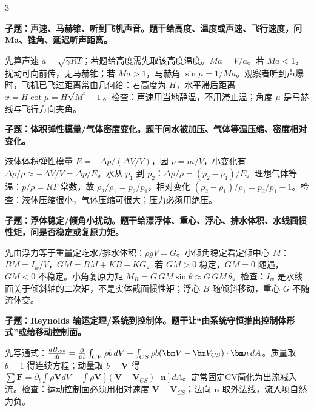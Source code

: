 \documentclass[a4paper]{article}
\newcommand{\qt}[1]{\vspace{0.04pt}\colorbox{Q}{\parbox{\dimexpr\linewidth-2\fboxsep}{\color{white}\bfseries #1}}\par}
\newcommand{\ans}[1]{\colorbox{G}{\parbox{\dimexpr\linewidth-2\fboxsep}{#1}}\par}
\begin{document}
\begin{multicols}{3}
\qt{子题：声速、马赫锥、听到飞机声音。题干给高度、温度或声速、飞行速度，问 Ma、锥角、延迟听声距离。}
\ans{先算声速 $a=\sqrt{\gamma RT}$；若题给高度需先取该高度温度。$Ma=V/a$。若 $Ma<1$，扰动可向前传，无马赫锥；若 $Ma>1$，马赫角 $\sin\mu=1/Ma$。观察者听到声爆时，飞机已飞过距离常由几何给：若高度为 $H$，水平滞后距离 $x=H\cot\mu=H\sqrt{M^2-1}$。检查：声速用当地静温，不用滞止温；角度 $\mu$ 是马赫线与飞行方向夹角。}
\qt{子题：体积弹性模量/气体密度变化。题干问水被加压、气体等温压缩、密度相对变化。}
\ans{液体体积弹性模量 $E=-\Delta p/(\Delta V/V)$，因 $\rho=m/V$，小变化有 $\Delta\rho/\rho\approx-\Delta V/V=\Delta p/E$。水从 $p_1$ 到 $p_2$：$\Delta\rho/\rho=(p_2-p_1)/E$。理想气体等温：$p/\rho=RT$ 常数，故 $\rho_2/\rho_1=p_2/p_1$，相对变化 $(\rho_2-\rho_1)/\rho_1=p_2/p_1-1$。检查：液体压缩很小，气体压缩可很大；压力必须用绝压。}
\qt{子题：浮体稳定/倾角小扰动。题干给漂浮体、重心、浮心、排水体积、水线面惯性矩，问是否稳定或复原力矩。}
\ans{先由浮力等于重量定吃水/排水体积：$\rho gV=G$。小倾角稳定看定倾中心 $M$：$BM=I_w/V$，$GM=BM+KB-KG$。若 $GM>0$ 稳定，$GM=0$ 随遇，$GM<0$ 不稳定。小角复原力矩 $M_R=G\,GM\sin\theta\approx G\,GM\,\theta$。检查：$I_w$ 是水线面关于倾斜轴的二次矩，不是实体截面惯性矩；浮心 $B$ 随倾斜移动，重心 $G$ 不随流体变。}
\qt{子题：Reynolds 输运定理/系统到控制体。题干让“由系统守恒推出控制体形式”或给移动控制面。}
\ans{先写通式：$\frac{dB_{\rm sys}}{dt}=\frac{\partial}{\partial t}\int_{CV}\rho b\,dV+\int_{CS}\rho b(\bm V-\bm V_{CS})\cdot\bm n\,dA$。质量取 $b=1$ 得连续方程；动量取 $b=\bm V$ 得 $\sum\bm F=\partial_t\int\rho\bm VdV+\int\rho\bm V[(\bm V-\bm V_{CS})\cdot\bm n]dA$。定常固定CV简化为出流减入流。检查：运动控制面必须用相对速度 $\bm V-\bm V_{CS}$；法向 $\bm n$ 取外法线，流入项自然为负。}
\end{multicols}
\end{document}

